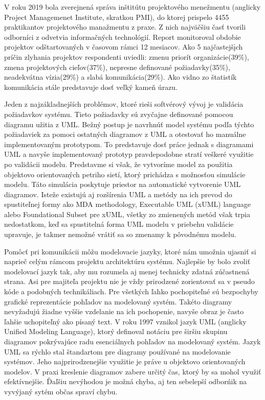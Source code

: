 V roku 2019 bola zverejnená správa inštitútu projektového menežmentu (anglicky Project Managemenet Institute, skratkou PMI), do ktorej prispelo 4455 praktikantov projektového manažmentu z praxe. Z nich najväčšiu časť tvorili odborníci z odvetvia informačných technológií. Report monitoroval obdobie projektov odštartovaných v časovom rámci 12 mesiacov. Ako 5 najčastejšįch príčin zlyhania projektov respondenti uviedli: zmenu priorít organizácie(39\%), zmena projektových cieľov(37\%), nepresne definované požiadavky(35\%), neadekvátna vízia(29\%) a slabá komunikácia(29\%).
Ako vidno zo štatistík komunikácia stále predstavuje dosť veľký kameň úrazu.

Jeden z najzákladnejších problémov, ktoré rieši softvérový vývoj je validácia požiadavkov systému. Tieto požiadavky sú zvyčajne definované pomocou diagramu užitia z UML. 
Bežný postup je navrhnúť model systému podľa týchto požiadaviek za pomoci ostatných diagramov z UML a otestovať ho manuálne implementovaným prototypom. To predstavuje dosť práce jednak s diagramami UML a navyše implementovaný prototyp pravdepodobne stratí veškeré využitie po validácii modelu. Predstavme si však, že vytvoríme model za použitia objektovo orientovaných petriho sietí, ktorý prichádza s možnosťou simulácie modelu. Táto simulácia poskytuje priestor na automatické vytvorenie UML diagramov. Isteže existujú aj rozšírenia UML a metódy na ich prevod do spustiteľnej formy ako MDA methodology, Executable UML (xUML) language alebo Foundational Subset pre xUML, všetky zo zmienených metód však trpia nedostatkom, keď sa spustitelná forma UML modelu v priebehu validácie upravuje, je takmer nemožné vrátiť sa so zmenamy k pôvodnému modelu. 

Pomôcť pri komunikácii môžu modelovacie jazyky, ktoré nám umožnia ujasniť si naprieč celým rámcom projektu architektúru systému. Najlepšie by bolo zvoliť modelovací jazyk tak, aby mu rozumela aj menej technicky zdatná zúčastnená strana. Asi pre majiteľa projektu nie je vždy prirodzené zorientovať sa v pseudo kóde a podobných technikáliach. Pre všetkých ľahko pochopiteľné sú bezpochyby grafické reprezentácie pohľadov na modelovaný systém. Takéto diagramy nevyžadujú žiadne vyššie vzdelanie na ich pochopenie, navyše obraz je často ľahšie uchopiteľný ako písaný text. V roku 1997 vznikol jazyk UML (anglicky Unified Modeling Language), ktorý definoval notáciu pre širšiu skupinu diagramov pokrývajúce radu esenciálnych pohľadov na modelovaný systém. Jazyk UML sa rýchlo stal štandartom pre diagramy používané na modelovanie systémov. Jeho najprirodzenejšie využitie je práve u objektovo orientovaných modelov. V praxi kreslenie diagramov zabere určitý čas, ktorý by sa mohol využiť efektívnejšie. Ďaľšiu nevýhodou je možná chyba, aj ten sebelepší odborńik na vyvýjaný sytém občas spraví chybu.

